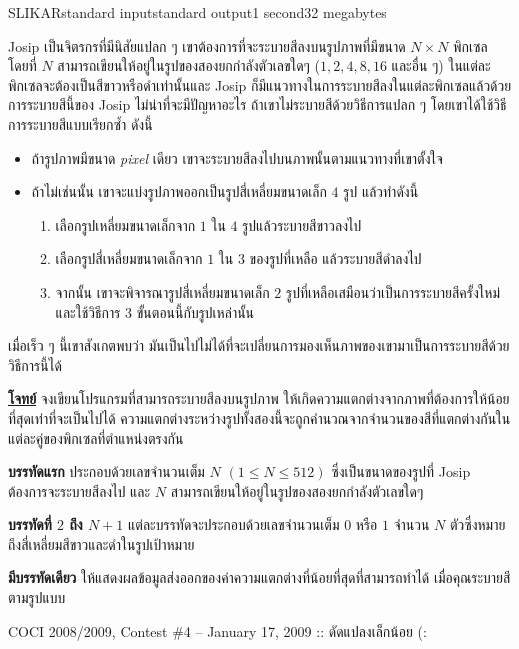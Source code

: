\documentclass[11pt,a4paper]{article}
\begin{document}
\begin{problem}{SLIKAR}{standard input}{standard output}{1 second}{32 megabytes}

Josip เป็นจิตรกรที่มีนิสัยแปลก ๆ   เขาต้องการที่จะระบายสีลงบนรูปภาพที่มีขนาด $N \times N$ พิกเซล โดยที่ $N$ สามารถเขียนให้อยู่ในรูปของสองยกกำลังตัวเลขใดๆ ($1, 2, 4, 8, 16$ และอื่น ๆ)    ในแต่ละพิกเซลจะต้องเป็นสีขาวหรือดำเท่านั้นและ Josip ก็มีแนวทางในการระบายสีลงในแต่ละพิกเซลแล้วด้วย
การระบายสีนี้ของ Josip ไม่น่าที่จะมีปัญหาอะไร ถ้าเขาไม่ระบายสีด้วยวิธีการแปลก ๆ โดยเขาได้ใช้วิธีการระบายสีแบบเรียกซ้ำ ดังนี้ 

\begin{itemize}

\item ถ้ารูปภาพมีขนาด \textit{pixel} เดียว  เขาจะระบายสีลงไปบนภาพนั้นตามแนวทางที่เขาตั้งใจ

\item ถ้าไม่เช่นนั้น   เขาจะแบ่งรูปภาพออกเป็นรูปสี่เหลี่ยมขนาดเล็ก $4$ รูป แล้วทำดังนี้
\begin{enumerate}
\item เลือกรูปเหลี่ยมขนาดเล็กจาก $1$ ใน $4$ รูปแล้วระบายสีขาวลงไป

\item เลือกรูปสี่เหลี่ยมขนาดเล็กจาก $1$ ใน $3$ ของรูปที่เหลือ แล้วระบายสีดำลงไป

\item จากนั้น เขาจะพิจารณารูปสี่เหลี่ยมขนาดเล็ก $2$ รูปที่เหลือเสมือนว่าเป็นการระบายสีครั้งใหม่ และใช้วิธีการ 3 ขั้นตอนนี้กับรูปเหล่านั้น
\end{enumerate} \end{itemize} 

เมื่อเร็ว ๆ นี้เขาสังเกตพบว่า  มันเป็นไปไม่ได้ที่จะเปลี่ยนการมองเห็นภาพของเขามาเป็นการระบายสีด้วยวิธีการนี้ได้

\bigskip
\underline{\textbf{โจทย์}}  จงเขียนโปรแกรมที่สามารถระบายสีลงบนรูปภาพ ให้เกิดความแตกต่างจากภาพที่ต้องการให้น้อยที่สุดเท่าที่จะเป็นไปได้ ความแตกต่างระหว่างรูปทั้งสองนี้จะถูกคำนวณจากจำนวนของสีที่แตกต่างกันในแต่ละคู่ของพิกเซลที่ตำแหน่งตรงกัน


\InputFile

\textbf{บรรทัดแรก} ประกอบด้วยเลขจำนวนเต็ม $N$ $(1 \leq N \leq 512)$ ซึ่งเป็นขนาดของรูปที่ Josip ต้องการจะระบายสีลงไป และ $N$ สามารถเขียนให้อยู่ในรูปของสองยกกำลังตัวเลขใดๆ

\textbf{บรรทัดที่ $2$ ถึง $N+1$} แต่ละบรรทัดจะประกอบด้วยเลขจำนวนเต็ม $0$ หรือ $1$ จำนวน $N$ ตัวซึ่งหมายถึงสี่เหลี่ยมสีขาวและดำในรูปเป้าหมาย


\OutputFile

\textbf{มีบรรทัดเดียว}   ให้แสดงผลข้อมูลส่งออกของค่าความแตกต่างที่น้อยที่สุดที่สามารถทำได้ เมื่อคุณระบายสีตามรูปแบบ

\Examples

\begin{example}
%
%
%
\end{example}

  
\Source

COCI 2008/2009, Contest \#4 – January 17, 2009 :: ดัดแปลงเล็กน้อย (:


\end{problem}
\end{document}
